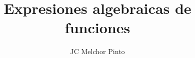 \documentclass[12pt,addpoints,answers]{guia}
\title{Expresiones algebraicas de funciones}
\author{JC Melchor Pinto}
\begin{document}
\INFO%
\begin{multicols}{2}
    
    \columnbreak
    
    
    
\end{multicols}

\begin{questions}
    \questionboxed[20]{}
    \questionboxed[20]{}
    \questionboxed[20]{}
    \questionboxed[20]{}
    \questionboxed[20]{}
\end{questions}
\end{document}
